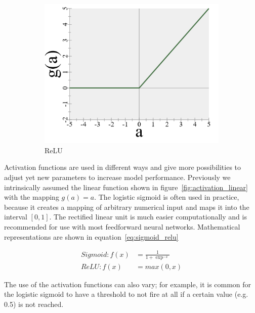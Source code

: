 \begin{figure}
\begin{subfigure}[b]{0.3\textwidth}
        \includegraphics[width=\textwidth]{images/4_relu.png}
        \caption{ReLU}
        \label{fig:activation_relu}
    \end{subfigure}
    \caption{} %
    \label{fig:activation}
\end{figure}

Activation functions are used in different ways and give more possibilities to adjust yet new parameters to increase model performance.
Previously we intrinsically assumed the linear function shown in figure~\ref{fig:activation_linear} with the mapping $g(a) = a$.
The logistic sigmoid is often used in practice, because it creates a mapping of arbitrary numerical input and maps it into the interval $[0,1]$.
The rectified linear unit is much easier computationally and is recommended for use with most feedforward neural networks\cite[p.169]{Goodfellow2017}\cite{Glorot2011}.
Mathematical representations are shown in equation~\eqref{eq:sigmoid_relu}

\begin{equation}
    \begin{split}
        Sigmoid: f(x) & = \frac{1}{1 + \exp^{-x}} \\ ReLU: f(x) & = max(0, x)
    \end{split}
    \label{eq:sigmoid_relu}
\end{equation}

The use of the activation functions can also vary; for example, it is common for the logistic sigmoid to have a threshold to not fire at all if a certain value (e.g. 0.5) is not reached.

